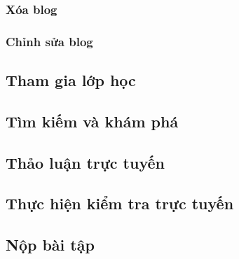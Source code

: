 \documentclass[./../main_file.tex]{subfiles}
\begin{document}
	\subsubsection{Xóa blog}
	\begin{figure}[H]
		\centering
		\resizebox{1.0\textwidth}{!}{}
	\end{figure}
	\subsubsection{Chỉnh sửa blog}
	\begin{figure}[H]
		\centering
		\resizebox{1.0\textwidth}{!}{}
	\end{figure}
	
	\subsection{Tham gia lớp học }
	\begin{figure}[H]
		\centering
		\resizebox{1.0\textwidth}{!}{}
	\end{figure}
	
	\subsection{Tìm kiếm và khám phá }
	\begin{figure}[H]
		\centering
		\resizebox{1.0\textwidth}{!}{}
	\end{figure}
	
	\subsection{Thảo luận trực tuyến }
	\begin{figure}[H]
		\centering
		\resizebox{1.0\textwidth}{!}{}
	\end{figure}
	
	\subsection{Thực hiện kiểm tra trực tuyến }
	\begin{figure}[H]
		\centering
		\resizebox{1.0\textwidth}{!}{}
	\end{figure}
	
	\subsection{Nộp bài tập}
	\begin{figure}[H]
		\centering
		\resizebox{1.0\textwidth}{!}{}
	\end{figure}
	
\end{document}
